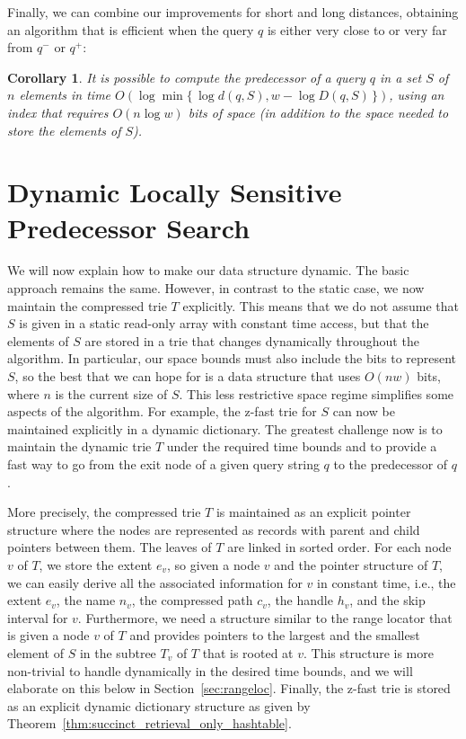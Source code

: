 \documentclass[a4paper,11pt]{article}
\newtheorem{corollary}[theorem]{Corollary}
\newcommand{\?}{\mskip1.5mu}
\begin{document}
Finally, we can combine our improvements for short and long 
distances, obtaining an algorithm that is
efficient when the query $q$ is either very close to or very far 
from $q^-$ or $q^+$:

\begin{corollary}
It is possible to compute the predecessor of a query $q$ in a set $S$
of $n$ elements in time $O(\log \min \{\,\log d(q, S), w - \log D(q,S)\,\})$, 
using an index that
requires $O(n \log w)$ bits of space (in addition to the space
needed to store the elements of $S$).
\end{corollary}

\section{Dynamic Locally Sensitive Predecessor Search}
\label{sec:dyn_pred}

We will now explain how to make our data
structure dynamic. 
The basic approach remains the same.
However, in contrast to the static case, we now 
maintain the compressed trie $T$ explicitly. 
This means that we do not assume that $S$
is given in a static read-only array with constant
time access, but that the elements of $S$
are stored in a trie that changes dynamically throughout
the algorithm. In particular, our space bounds must also 
include the bits to represent $S$, so the best 
that we can hope for is a data structure that uses $O(nw)$
bits, where $n$ is the current size of $S$. This less restrictive
space regime simplifies some aspects of the algorithm. For example,
the z-fast trie for $S$ can now be maintained explicitly in a
dynamic dictionary. The greatest challenge now is to maintain
the dynamic trie $T$ under the required time bounds and to provide
a fast way to go from the exit node of a given query string $q$ to the 
predecessor of $q$.

More precisely, the compressed trie $T$ is maintained as
an explicit pointer structure where the nodes are represented
as records with parent and
child pointers between them. The leaves of $T$ are
linked in sorted order. For each node
$v$ of $T$, we store the extent $e_v$,
so given a node $v$ and the pointer structure
of $T$, we can easily derive all the associated
information for $v$ in constant time, i.e., the extent $e_v$, 
the name $n_v$, the compressed path $c_v$, the handle $h_v$, and the skip 
interval for $v$.
Furthermore, we need a structure similar to the range locator 
that is given a node $v$ of $T$ and provides pointers to
the largest and the smallest element of $S$ in the subtree
$T_v$ of $T$ that is rooted at $v$. This structure is more non-trivial
to handle dynamically in the desired time bounds, and we will elaborate
on this below in Section~\ref{sec:rangeloc}. 
Finally, the z-fast trie is stored as an explicit
dynamic dictionary structure as given by 
Theorem~\ref{thm:succinct_retrieval_only_hashtable}.
\end{document}
